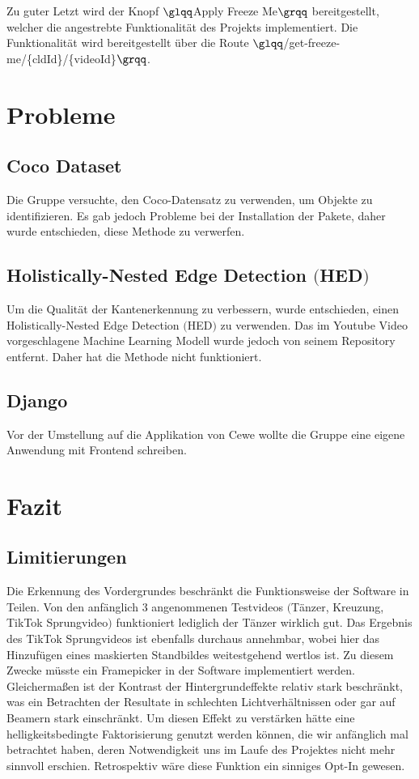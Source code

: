 \documentclass[12pt]{scrartcl}
\begin{document}
Zu guter Letzt wird der Knopf $\glqq$Apply Freeze Me$\grqq$ bereitgestellt, welcher die angestrebte Funktionalit\"at des Projekts implementiert. Die Funktionalit\"at wird bereitgestellt \"uber die Route $\glqq$/get-freeze-me/\{cldId\}/\{videoId\}$\grqq$.

\section{Probleme}
\subsection{Coco Dataset}
Die Gruppe versuchte, den Coco-Datensatz zu verwenden, um Objekte zu identifizieren. Es gab jedoch Probleme bei der Installation der Pakete, daher wurde entschieden, diese Methode zu verwerfen.
\subsection{Holistically-Nested Edge Detection $($HED$)$}
Um die Qualit\"at der Kantenerkennung zu verbessern, wurde entschieden, einen Holistically-Nested Edge Detection $($HED$)$ zu verwenden. Das im Youtube Video vorgeschlagene Machine Learning Modell wurde jedoch von seinem Repository entfernt. Daher hat die Methode nicht funktioniert.
\subsection{Django}
Vor der Umstellung auf die Applikation von Cewe wollte die Gruppe eine eigene Anwendung mit Frontend schreiben.

\section{Fazit}
\subsection{Limitierungen}
Die Erkennung des Vordergrundes beschr\"ankt die Funktionsweise der Software in Teilen. Von den anf\"anglich 3 angenommenen Testvideos
$ ( $T\"anzer, Kreuzung, TikTok Sprungvideo$ ) $ funktioniert lediglich der T\"anzer wirklich gut. Das Ergebnis des TikTok Sprungvideos ist
ebenfalls durchaus annehmbar, wobei hier das Hinzuf\"ugen eines maskierten Standbildes weitestgehend wertlos ist. Zu diesem Zwecke m\"usste ein Framepicker in der Software implementiert werden. Gleicherma{\ss}en ist der Kontrast der Hintergrundeffekte relativ stark beschr\"ankt, was ein Betrachten der Resultate in schlechten Lichtverh\"altnissen oder gar auf Beamern stark einschr\"ankt. Um diesen Effekt zu verst\"arken h\"atte eine helligkeitsbedingte Faktorisierung genutzt werden k\"onnen, die wir anf\"anglich mal betrachtet haben, deren Notwendigkeit uns im Laufe des Projektes nicht mehr sinnvoll erschien. Retrospektiv w\"are diese Funktion ein sinniges Opt-In gewesen.
\end{document}
